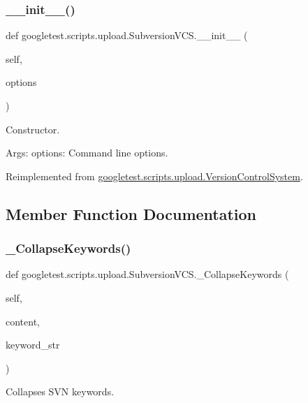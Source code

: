 \subsubsection{\texorpdfstring{\_\_init\_\_()}{\_\_init\_\_()}}
{\footnotesize\ttfamily def googletest.\+scripts.\+upload.\+Subversion\+V\+C\+S.\+\_\+\+\_\+init\+\_\+\+\_\+ (\begin{DoxyParamCaption}\item[{}]{self,  }\item[{}]{options }\end{DoxyParamCaption})}

\begin{DoxyVerb}Constructor.

Args:
  options: Command line options.
\end{DoxyVerb}
 

Reimplemented from \mbox{\hyperlink{classgoogletest_1_1scripts_1_1upload_1_1_version_control_system_a9dacd7672221771e0daf316d8c53e11c}{googletest.\+scripts.\+upload.\+Version\+Control\+System}}.



\subsection{Member Function Documentation}
\mbox{\label{classgoogletest_1_1scripts_1_1upload_1_1_subversion_v_c_s_a1879e59e7f9c4a680dc66c2c5af838ad}} 
\subsubsection{\texorpdfstring{\_CollapseKeywords()}{\_CollapseKeywords()}}
{\footnotesize\ttfamily def googletest.\+scripts.\+upload.\+Subversion\+V\+C\+S.\+\_\+\+Collapse\+Keywords (\begin{DoxyParamCaption}\item[{}]{self,  }\item[{}]{content,  }\item[{}]{keyword\+\_\+str }\end{DoxyParamCaption})\hspace{0.3cm}{\ttfamily [private]}}

\begin{DoxyVerb}Collapses SVN keywords.\end{DoxyVerb}
 \mbox{\label{classgoogletest_1_1scripts_1_1upload_1_1_subversion_v_c_s_a9ef359cbdafd4e3d52626243665a7b97}} 
